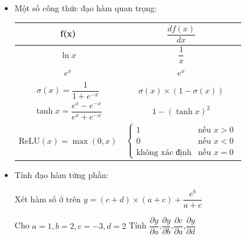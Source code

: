 \documentclass[final,letterpaper,twoside,12pt]{report}
\begin{document}
\begin{itemize}
\begin{tikzpicture}
	      \end{tikzpicture}
	\item  Một số công thức đạo hàm quan trọng:
	      \begin{table}[h]
		      \centering
		      \renewcommand{\arraystretch}{2}
		      \begin{tabular}{|c|c|}
			      \hline
			      f(x)                                            & $\dfrac{d f(x)}{dx}$           \\
			      \hline
			      $\ln{x}$                                        & $\dfrac{1}{x}$                 \\
			      \hline
			      $e^x$                                           & $e^x$                          \\
			      \hline
			      $\sigma(x) = \dfrac{1}{1+e^{-x}}$               & $\sigma(x)\times(1-\sigma(x))$ \\
			      \hline
			      $\tanh{x} = \dfrac{e^x - e^{-x}}{e^x + e^{-x}}$ & $1 - (\tanh{x})^2$             \\
			      \hline
			      $\text{ReLU}(x) = \max(0, x)$                   &
			      $\begin{cases}
					       1                     & \text{nếu } x > 0 \\
					       0                     & \text{nếu } x < 0 \\
					       \text{không xác định} & \text{nếu } x = 0
				       \end{cases}$                                       \\
			      \hline
		      \end{tabular}
	      \end{table}

	      \newpage
	\item Tính đạo hàm từng phần:

	      Xét hàm số ở trên $y = (c+d)\times (a+c) + \dfrac{e^b}{a+c} $

	      Cho $a = 1, b=2, c=-3 , d=2$ Tính $\dfrac{\partial y}{\partial a}$,$\dfrac{\partial y}{\partial b}$,$\dfrac{\partial c}{\partial a}$,$\dfrac{\partial y}{\partial d}$

\end{itemize}
\end{document}
